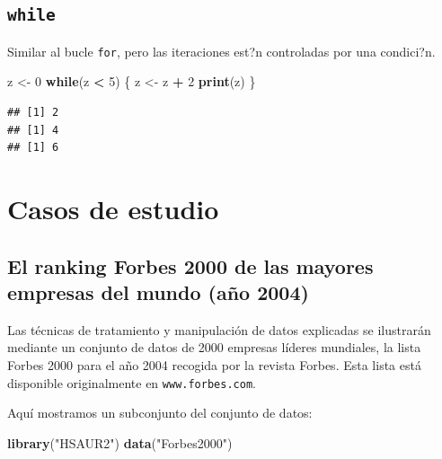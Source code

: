 \documentclass[]{book}
\newenvironment{Shaded}{\begin{snugshade}}{\end{snugshade}}
\newcommand{\KeywordTok}[1]{\textcolor[rgb]{0.13,0.29,0.53}{\textbf{#1}}}
\newcommand{\DecValTok}[1]{\textcolor[rgb]{0.00,0.00,0.81}{#1}}
\newcommand{\StringTok}[1]{\textcolor[rgb]{0.31,0.60,0.02}{#1}}
\newcommand{\ControlFlowTok}[1]{\textcolor[rgb]{0.13,0.29,0.53}{\textbf{#1}}}
\newcommand{\OperatorTok}[1]{\textcolor[rgb]{0.81,0.36,0.00}{\textbf{#1}}}
\newcommand{\NormalTok}[1]{#1}
\begin{document}
\section{\texorpdfstring{\texttt{while}}{while}}\label{while-1}

Similar al bucle \texttt{for}, pero las iteraciones est?n controladas
por una condici?n.

\begin{Shaded}
\begin{Highlighting}[]
\NormalTok{z <-}\StringTok{ }\DecValTok{0}
\ControlFlowTok{while}\NormalTok{(z }\OperatorTok{<}\StringTok{ }\DecValTok{5}\NormalTok{) \{}
\NormalTok{    z <-}\StringTok{ }\NormalTok{z }\OperatorTok{+}\StringTok{ }\DecValTok{2}
    \KeywordTok{print}\NormalTok{(z) }
\NormalTok{\}}
\end{Highlighting}
\end{Shaded}

\begin{verbatim}
## [1] 2
## [1] 4
## [1] 6
\end{verbatim}

\chapter{Casos de estudio}\label{casos-de-estudio}

\section{El ranking Forbes 2000 de las mayores empresas del mundo (año
2004)}\label{el-ranking-forbes-2000-de-las-mayores-empresas-del-mundo-ano-2004}

Las técnicas de tratamiento y manipulación de datos explicadas se
ilustrarán mediante un conjunto de datos de 2000 empresas líderes
mundiales, la lista Forbes 2000 para el año 2004 recogida por la revista
Forbes. Esta lista está disponible originalmente en
\texttt{www.forbes.com}.

Aquí mostramos un subconjunto del conjunto de datos:

\begin{Shaded}
\begin{Highlighting}[]
\KeywordTok{library}\NormalTok{(}\StringTok{"HSAUR2"}\NormalTok{)}
\KeywordTok{data}\NormalTok{(}\StringTok{"Forbes2000"}\NormalTok{)}
\end{Highlighting}
\end{Shaded}
\end{document}
